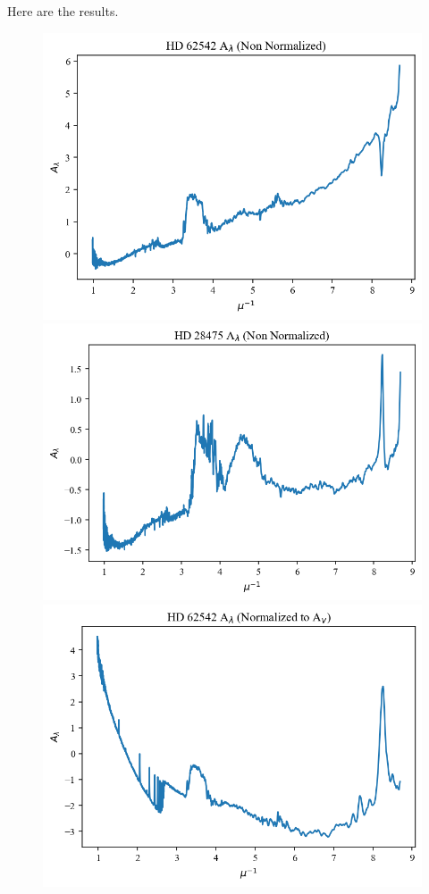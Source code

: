 \documentclass{article}
\begin{document}
    \subsection{}

    Here are the results.

    \begin{figure}[H]
        \centering
        \includegraphics[scale = .5]{Figure 2025-02-02 013752 (0).png}
        \includegraphics[scale = .5]{Figure 2025-02-02 013752 (1).png}
        \includegraphics[scale = .5]{Figure 2025-02-02 013752 (2).png}

\end{figure}
\end{document}
